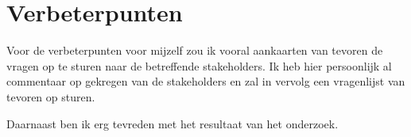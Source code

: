 \section{Verbeterpunten}
Voor de verbeterpunten voor mijzelf zou ik vooral aankaarten van tevoren de vragen op te sturen naar de betreffende stakeholders.
Ik heb hier persoonlijk al commentaar op gekregen van de stakeholders en zal in vervolg een vragenlijst van tevoren op sturen.

\whitespace
Daarnaast ben ik erg tevreden met het resultaat van het onderzoek.
